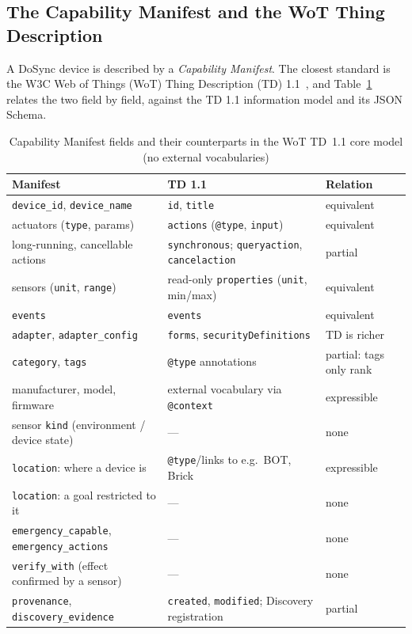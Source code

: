 \documentclass[conference]{IEEEtran}
\newcommand{\code}[1]{\texttt{#1}}
\begin{document}
\subsection{The Capability Manifest and the WoT Thing Description}
A DoSync device is described by a \emph{Capability Manifest}. The closest standard is the W3C Web of Things (WoT) Thing Description (TD) 1.1~\cite{wot-td11}, and Table~\ref{tab:td} relates the two field by field, against the TD 1.1 information model and its JSON Schema.

\begin{table}[t]
\caption{Capability Manifest fields and their counterparts in the WoT TD~1.1 core model (no external vocabularies)}
\label{tab:td}
\centering
\scriptsize
\setlength{\tabcolsep}{2.5pt}
\renewcommand{\arraystretch}{1.1}
\begin{tabular}{@{}>{\raggedright\arraybackslash}p{}>{\raggedright\arraybackslash}p{}>{\raggedright\arraybackslash}p{}@{}}
\toprule
\textbf{Manifest} & \textbf{TD 1.1} & \textbf{Relation} \\
\midrule
\code{device\_\allowbreak id}, \code{device\_\allowbreak name} & \code{id}, \code{title} & equivalent \\
actuators (\code{type}, params) & \code{actions} (\code{@type}, \code{input}) & equivalent \\
long-running, cancellable actions & \code{synchronous}; \code{queryaction}, \code{cancelaction} & partial \\
sensors (\code{unit}, \code{range}) & read-only \code{properties} (\code{unit}, min/max) & equivalent \\
\code{events} & \code{events} & equivalent \\
\code{adapter}, \code{adapter\_\allowbreak config} & \code{forms}, \code{securityDefinitions} & TD is richer \\
\code{category}, \code{tags} & \code{@type} annotations & partial: tags only rank \\
manufacturer, model, firmware & external vocabulary via \code{@context} & expressible \\
\midrule
sensor \code{kind} (environment / device state) & --- & none \\
\code{location}: where a device is & \code{@type}/links to e.g.\ BOT, Brick & expressible \\
\code{location}: a goal restricted to it & --- & none \\
\code{emergency\_\allowbreak capable}, \code{emergency\_\allowbreak actions} & --- & none \\
\code{verify\_\allowbreak with} (effect confirmed by a sensor) & --- & none \\
\code{provenance}, \code{discovery\_\allowbreak evidence} & \code{created}, \code{modified}; Discovery registration & partial \\
\bottomrule
\end{tabular}
\end{table}
\end{document}
